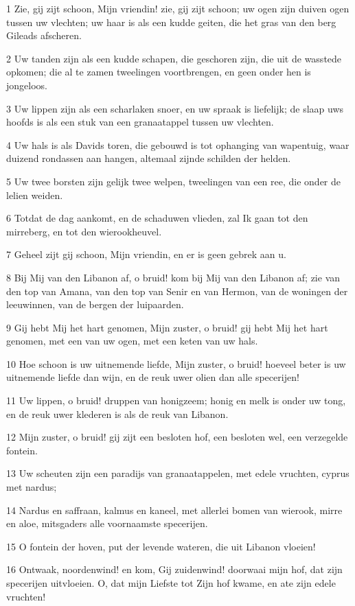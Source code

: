 \par 1 Zie, gij zijt schoon, Mijn vriendin! zie, gij zijt schoon; uw ogen zijn duiven ogen tussen uw vlechten; uw haar is als een kudde geiten, die het gras van den berg Gileads afscheren.
\par 2 Uw tanden zijn als een kudde schapen, die geschoren zijn, die uit de wasstede opkomen; die al te zamen tweelingen voortbrengen, en geen onder hen is jongeloos.
\par 3 Uw lippen zijn als een scharlaken snoer, en uw spraak is liefelijk; de slaap uws hoofds is als een stuk van een granaatappel tussen uw vlechten.
\par 4 Uw hals is als Davids toren, die gebouwd is tot ophanging van wapentuig, waar duizend rondassen aan hangen, altemaal zijnde schilden der helden.
\par 5 Uw twee borsten zijn gelijk twee welpen, tweelingen van een ree, die onder de lelien weiden.
\par 6 Totdat de dag aankomt, en de schaduwen vlieden, zal Ik gaan tot den mirreberg, en tot den wierookheuvel.
\par 7 Geheel zijt gij schoon, Mijn vriendin, en er is geen gebrek aan u.
\par 8 Bij Mij van den Libanon af, o bruid! kom bij Mij van den Libanon af; zie van den top van Amana, van den top van Senir en van Hermon, van de woningen der leeuwinnen, van de bergen der luipaarden.
\par 9 Gij hebt Mij het hart genomen, Mijn zuster, o bruid! gij hebt Mij het hart genomen, met een van uw ogen, met een keten van uw hals.
\par 10 Hoe schoon is uw uitnemende liefde, Mijn zuster, o bruid! hoeveel beter is uw uitnemende liefde dan wijn, en de reuk uwer olien dan alle specerijen!
\par 11 Uw lippen, o bruid! druppen van honigzeem; honig en melk is onder uw tong, en de reuk uwer klederen is als de reuk van Libanon.
\par 12 Mijn zuster, o bruid! gij zijt een besloten hof, een besloten wel, een verzegelde fontein.
\par 13 Uw scheuten zijn een paradijs van granaatappelen, met edele vruchten, cyprus met nardus;
\par 14 Nardus en saffraan, kalmus en kaneel, met allerlei bomen van wierook, mirre en aloe, mitsgaders alle voornaamste specerijen.
\par 15 O fontein der hoven, put der levende wateren, die uit Libanon vloeien!
\par 16 Ontwaak, noordenwind! en kom, Gij zuidenwind! doorwaai mijn hof, dat zijn specerijen uitvloeien. O, dat mijn Liefste tot Zijn hof kwame, en ate zijn edele vruchten!

